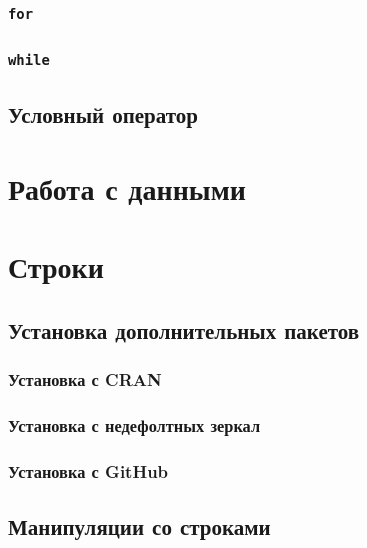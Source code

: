 \documentclass[
  letterpaper,
  DIV=11,
  numbers=noendperiod]{scrreprt}
\theoremstyle{definition}
\theoremstyle{remark}
\begin{document}
\subsection{\texorpdfstring{\texttt{for}}{for}}\label{controlflow-for}

\subsection{\texorpdfstring{\texttt{while}}{while}}\label{controlflow-while}

\section{Условный оператор}\label{controlflow-if}


\chapter{Работа с данными}\label{rdata}


\chapter{Строки}\label{rstrings}

\section{Установка дополнительных пакетов}\label{rstrings-packages}

\subsection{Установка с CRAN}\label{rstrings-packages-cran}

\subsection{Установка с недефолтных
зеркал}\label{rstrings-packages-mirrors}

\subsection{Установка с GitHub}\label{rstrings-packages-github}

\section{Манипуляции со строками}\label{rstrings-manipulations}
\end{document}
